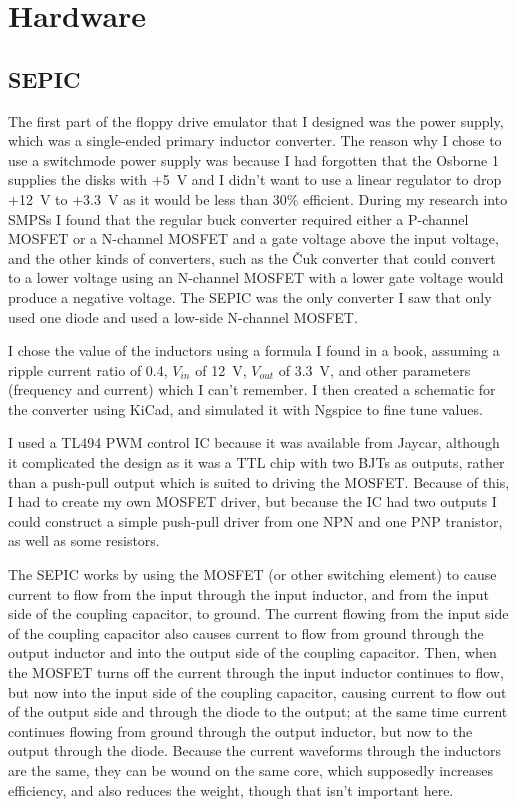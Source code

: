 \documentclass[a4paper]{article}
\begin{document}
\section{Hardware}

\subsection{SEPIC}

The first part of the floppy drive emulator that I designed was the
power supply, which was a single-ended primary inductor converter. The
reason why I chose to use a switchmode power supply was because I had
forgotten that the Osborne 1 supplies the disks with +5~V and I didn't
want to use a linear regulator to drop +12~V to +3.3~V as it would be
less than 30\% efficient. During my research into SMPSs I found that
the regular buck converter required either a P-channel MOSFET or a
N-channel MOSFET and a gate voltage above the input voltage, and the
other kinds of converters, such as the \v{C}uk converter that could
convert to a lower voltage using an N-channel MOSFET with a lower gate
voltage would produce a negative voltage. The SEPIC was the only
converter I saw that only used one diode and used a low-side N-channel
MOSFET.

I chose the value of the inductors using a formula I found in a book,
assuming a ripple current ratio of 0.4, \(V_{in}\) of \qty{12}{\V},
\(V_{out}\) of \qty{3.3}{\V}, and other parameters (frequency and
current) which I can't remember. I then created a schematic for the
converter using KiCad, and simulated it with Ngspice to fine tune
values.

I used a TL494 PWM control IC because it was available from Jaycar,
although it complicated the design as it was a TTL chip with two BJTs
as outputs, rather than a push-pull output which is suited to driving
the MOSFET. Because of this, I had to create my own MOSFET driver, but
because the IC had two outputs I could construct a simple push-pull
driver from one NPN and one PNP tranistor, as well as some resistors.

The SEPIC works by using the MOSFET (or other switching element) to
cause current to flow from the input through the input inductor, and
from the input side of the coupling capacitor, to ground. The current
flowing from the input side of the coupling capacitor also causes
current to flow from ground through the output inductor and into the
output side of the coupling capacitor. Then, when the MOSFET turns off
the current through the input inductor continues to flow, but now into
the input side of the coupling capacitor, causing current to flow out
of the output side and through the diode to the output; at the same
time current continues flowing from ground through the output
inductor, but now to the output through the diode. Because the current
waveforms through the inductors are the same, they can be wound on the
same core, which supposedly increases efficiency, and also reduces the
weight, though that isn't important here.
\end{document}
